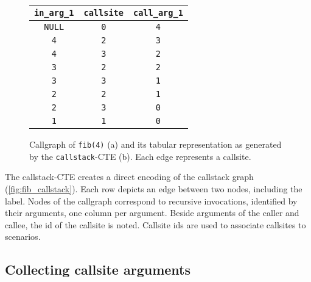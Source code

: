 \begin{figure}[h!]\small
    \begin{minipage}[b]{.5\linewidth}
    \centering
    
    \label{fig:fib_callstack_graph}
    \end{minipage}%
    \begin{minipage}[b]{.5\linewidth}
    \centering
     
    \begin{tabular}{c|c|c}
        \texttt{in\_arg\_1} & \texttt{callsite} & \texttt{call\_arg\_1} \\
        \hline
        \hline
        \texttt{NULL} & \texttt{0} & \texttt{4}\\
        \texttt{4} & \texttt{2} & \texttt{3}\\
        \texttt{4} & \texttt{3} & \texttt{2}\\
        \hline
        \hline
        \texttt{3} & \texttt{2} & \texttt{2}\\
        \texttt{3} & \texttt{3} & \texttt{1}\\
        \texttt{2} & \texttt{2} & \texttt{1}\\
        \texttt{2} & \texttt{3} & \texttt{0}\\
        \hline
        \texttt{1} & \texttt{1} & \texttt{0}\\
        \hline
    \end{tabular}
    \label{fig:fib_callstack_table}
    \end{minipage}
    \caption{Callgraph of \texttt{fib(4)} (a) and its tabular representation as generated by the \texttt{callstack}-CTE (b). Each edge represents a callsite.}\label{fig:fib_callstack}
\end{figure}

The callstack-CTE creates a direct encoding of the callstack graph (\autoref{fig:fib_callstack}). Each row depicts an edge between two nodes, including the label. Nodes of the callgraph correspond to recursive invocations, identified by their arguments, one column per argument. Beside arguments of the caller and callee, the id of the callsite is noted. Callsite ids are used to associate callsites to scenarios.

\subsection{Collecting callsite arguments}

